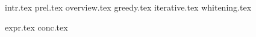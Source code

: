 \documentclass[twoside,11pt]{article}
\begin{document}
 {intr.tex}
 {prel.tex}
 {overview.tex}
 {greedy.tex}
 {iterative.tex}
 {whitening.tex}

 {expr.tex}
 {conc.tex}



\newpage


\end{document}
